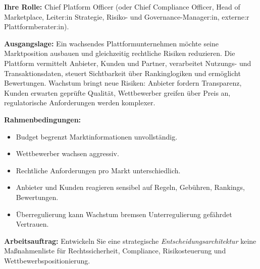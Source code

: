 \documentclass[11pt,a4paper,oneside]{article}
\begin{document}
\begin{infobox}
\textbf{Ihre Rolle:} Chief Platform Officer (oder Chief Compliance Officer, Head of Marketplace, Leiter:in Strategie, Risiko- und Governance-Manager:in, externe:r Plattformberater:in).

\smallskip
\textbf{Ausgangslage:} Ein wachsendes Plattformunternehmen möchte seine Marktposition ausbauen und gleichzeitig rechtliche Risiken reduzieren. Die Plattform vermittelt Anbieter, Kunden und Partner, verarbeitet Nutzungs- und Transaktionsdaten, steuert Sichtbarkeit über Rankinglogiken und ermöglicht Bewertungen. Wachstum bringt neue Risiken: Anbieter fordern Transparenz, Kunden erwarten geprüfte Qualität, Wettbewerber greifen über Preis an, regulatorische Anforderungen werden komplexer.

\smallskip
\textbf{Rahmenbedingungen:}
\begin{itemize}
  \item Budget begrenzt \textperiodcentered{} Marktinformationen unvollständig.
  \item Wettbewerber wachsen aggressiv.
  \item Rechtliche Anforderungen pro Markt unterschiedlich.
  \item Anbieter und Kunden reagieren sensibel auf Regeln, Gebühren, Rankings, Bewertungen.
  \item Überregulierung kann Wachstum bremsen \textendash{} Unterregulierung gefährdet Vertrauen.
\end{itemize}
\end{infobox}

\noindent\textbf{Arbeitsauftrag:} Entwickeln Sie eine strategische \emph{Entscheidungsarchitektur} \textendash{} keine Maßnahmenliste \textendash{} für Rechtssicherheit, Compliance, Risikosteuerung und Wettbewerbspositionierung.
\end{document}
